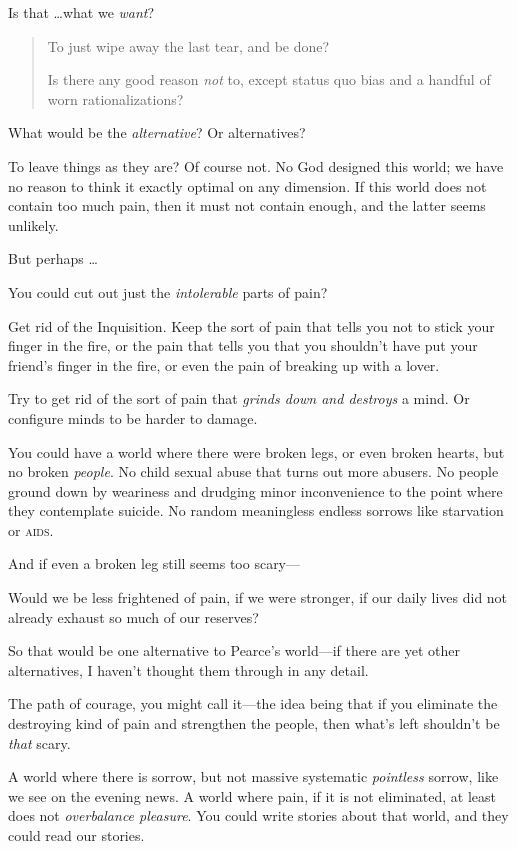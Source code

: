 {
 Is that \ldots what we \textit{want}?}

\begin{quote}
{
 To just wipe away the last tear, and be done?}

{
 Is there any good reason \textit{not} to, except status quo bias
 and a handful of worn rationalizations?}
\end{quote}

{
 What would be the \textit{alternative}? Or alternatives?}

{
 To leave things as they are? Of course not. No God designed this
world; we have no reason to think it exactly optimal on any dimension.
If this world does not contain too much pain, then it must not contain
enough, and the latter seems unlikely.}

{
 But perhaps \ldots}

{
 You could cut out just the \textit{intolerable} parts of pain?}

{
 Get rid of the Inquisition. Keep the sort of pain that tells you
not to stick your finger in the fire, or the pain that tells you that
you shouldn't have put your friend's
finger in the fire, or even the pain of breaking up with a lover.}

{
 Try to get rid of the sort of pain that \textit{grinds down and
destroys} a mind. Or configure minds to be harder to damage.}

{
 You could have a world where there were broken legs, or even
broken hearts, but no broken \textit{people}. No child sexual abuse
that turns out more abusers. No people ground down by weariness and
drudging minor inconvenience to the point where they contemplate
suicide. No random meaningless endless sorrows like starvation or
\textsc{aids}.}

{
 And if even a broken leg still seems too scary---}

{
 Would we be less frightened of pain, if we were stronger, if our
daily lives did not already exhaust so much of our reserves?}

{
 So that would be one alternative to Pearce's
world---if there are yet other alternatives, I haven't
thought them through in any detail.}

{
 The path of courage, you might call it---the idea being that if
you eliminate the destroying kind of pain and strengthen the people,
then what's left shouldn't be
\textit{that} scary.}

{
 A world where there is sorrow, but not massive systematic
\textit{pointless} sorrow, like we see on the evening news. A world
where pain, if it is not eliminated, at least does not
\textit{overbalance pleasure}. You could write stories about that
world, and they could read our stories.}

